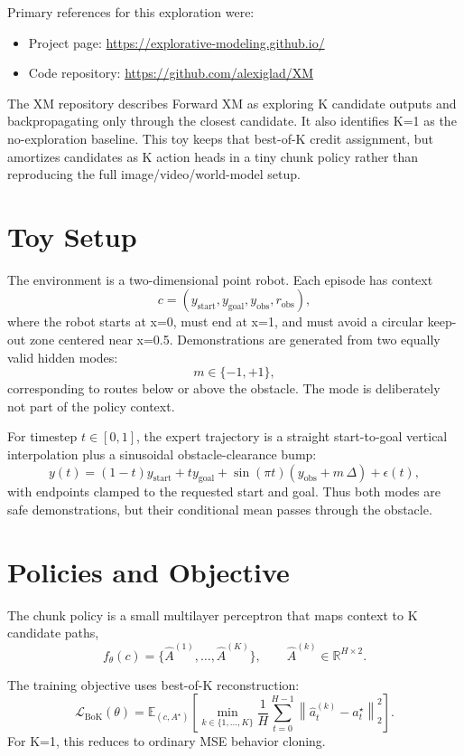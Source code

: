 \documentclass[11pt]{article}
\begin{document}
Primary references for this exploration were:
\begin{itemize}[leftmargin=1.5em]
  \item Project page: \url{https://explorative-modeling.github.io/}
  \item Code repository: \url{https://github.com/alexiglad/XM}
\end{itemize}

The XM repository describes Forward XM as exploring K candidate outputs and backpropagating only through the closest candidate. It also identifies K=1 as the no-exploration baseline. This toy keeps that best-of-K credit assignment, but amortizes candidates as K action heads in a tiny chunk policy rather than reproducing the full image/video/world-model setup.

\section{Toy Setup}

The environment is a two-dimensional point robot. Each episode has context
\[
  c = (y_{\mathrm{start}}, y_{\mathrm{goal}}, y_{\mathrm{obs}}, r_{\mathrm{obs}}),
\]
where the robot starts at x=0, must end at x=1, and must avoid a circular keep-out zone centered near x=0.5. Demonstrations are generated from two equally valid hidden modes:
\[
  m \in \{-1,+1\},
\]
corresponding to routes below or above the obstacle. The mode is deliberately not part of the policy context.

For timestep \(t \in [0,1]\), the expert trajectory is a straight start-to-goal vertical interpolation plus a sinusoidal obstacle-clearance bump:
\[
  y(t) = (1-t)y_{\mathrm{start}} + t y_{\mathrm{goal}}
       + \sin(\pi t)\left(y_{\mathrm{obs}} + m\,\Delta\right) + \epsilon(t),
\]
with endpoints clamped to the requested start and goal. Thus both modes are safe demonstrations, but their conditional mean passes through the obstacle.

\section{Policies and Objective}

The chunk policy is a small multilayer perceptron that maps context to K candidate paths,
\[
  f_{\theta}(c) = \{\hat{A}^{(1)},\ldots,\hat{A}^{(K)}\},
  \qquad \hat{A}^{(k)} \in \mathbb{R}^{H\times 2}.
\]

The training objective uses best-of-K reconstruction:
\[
  \mathcal{L}_{\mathrm{BoK}}(\theta)
  = \mathbb{E}_{(c,A^{\star})}
    \left[\min_{k\in\{1,\ldots,K\}}\frac{1}{H}\sum_{t=0}^{H-1}
    \left\|\hat{a}^{(k)}_t - a^{\star}_t\right\|_2^2\right].
\]
For K=1, this reduces to ordinary MSE behavior cloning.
\end{document}
